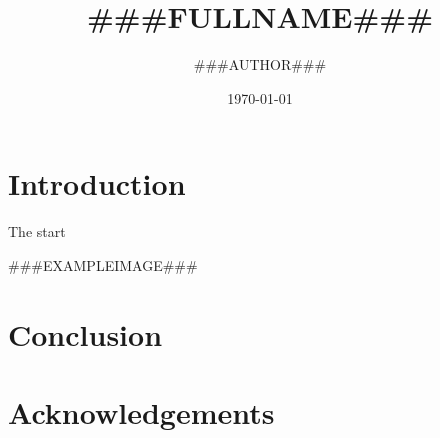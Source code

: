 \documentclass[times]{article}
\begin{document}
\title{###FULLNAME###}

\onecolumn

\author{###AUTHOR###}
\date{\today}

\maketitle


\tableofcontents

\newpage

\section{Introduction}

The start

###EXAMPLEIMAGE###

\section{Conclusion}

\section{Acknowledgements}



\end{document}

